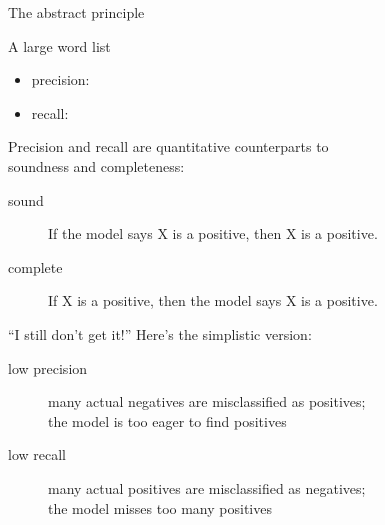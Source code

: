 \documentclass[professionalfonts, xcolor={usenames,svgnames,x11names,table}]{beamer}
\begin{document}
\begin{frame}{The abstract principle}
    \begin{example}
        A large word list
        \begin{itemize}
            \item {} precision: 
            \item {} recall: 
        \end{itemize}
    \end{example}

    Precision and recall are quantitative counterparts to\\
    soundness and completeness:

    \begin{description}
        \item[sound] If the model says X is a positive, then X is a positive.
        \item[complete] If X is a positive, then the model says X is a positive.
    \end{description}
\end{frame}

\begin{frame}{``I still don't get it!''}
    Here's the simplistic version:

    \begin{description}
        \item[low precision] many actual negatives are misclassified as positives;\\
                             the model is too eager to find positives
        \item[low recall]    many actual positives are misclassified as negatives;\\
                             the model misses too many positives
    \end{description}
\end{frame}
\end{document}
